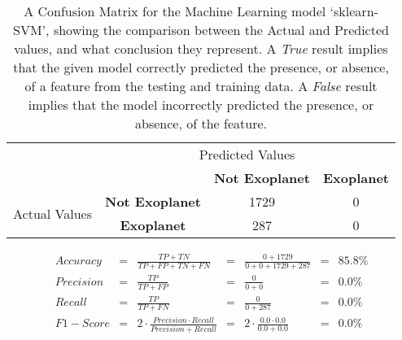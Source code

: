 
    \renewcommand{\arraystretch}{2}
    \renewcommand{\tabcolsep}{20.25pt}
    \vspace{-0.5cm}
    \begin{table}[ht]
    \begin{tabular}{cccc}
     & \multicolumn{3}{c}{Predicted Values} \\ \cline{3-4}
     & \multicolumn{1}{c|}{} & \multicolumn{1}{c|}{\textbf{Not Exoplanet}} & \multicolumn{1}{c|}{\textbf{Exoplanet}} \\ \cline{2-4}
    \multicolumn{1}{c|}{\multirow{2}{2.0cm}{Actual Values}} & \multicolumn{1}{c|}{\textbf{Not Exoplanet}} & \multicolumn{1}{c|}{1729} & \multicolumn{1}{c|}{0} \\ \cline{2-4}
    \multicolumn{1}{c|}{} & \multicolumn{1}{c|}{\textbf{Exoplanet}} & \multicolumn{1}{c|}{287} & \multicolumn{1}{c|}{0} \\ \cline{2-4}
    \end{tabular}
    \caption{A Confusion Matrix for the Machine Learning model `sklearn-SVM', showing the comparison between the Actual and Predicted values, and what conclusion they represent. A \emph{True} result implies that the given model correctly predicted the presence, or absence, of a feature from the testing and training data. A \emph{False} result implies that the model incorrectly predicted the presence, or absence, of the feature.}
    \label{tab:sklearn-SVMconfusionmatrix}
    \end{table}
    \vspace{-0.75cm}
    \label{eq:metrics-sklearn-SVM}
    \begin{align*}
        Accuracy &= &\frac{TP + TN}{TP + FP + TN + FN} &= &\frac{0 + 1729}{0 + 0 + 1729 + 287} &= & 85.8\% \\
        Precision &= &\frac{TP}{TP + FP} &= &\frac{0}{0 + 0} &= & 0.0\% \\
        Recall &= &\frac{TP}{TP + FN} &= &\frac{0}{0 + 287} &= & 0.0\% \\
        F1-Score &= &2 \cdot \frac{Precision \cdot Recall}{Precision + Recall} &= &2 \cdot \frac{0.0 \cdot 0.0}{0.0 + 0.0} &= & 0.0\% \\
    \end{align*}
    \vspace{-1.75cm}
    \renewcommand{\arraystretch}{1}
    \renewcommand{\tabcolsep}{5.25pt}
    